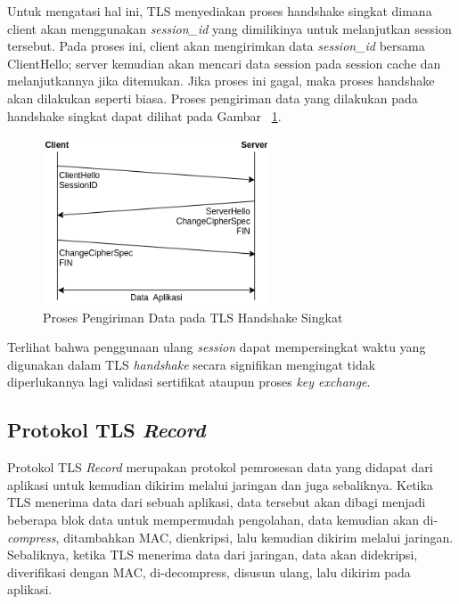     Untuk mengatasi hal ini, TLS menyediakan proses handshake singkat dimana client akan menggunakan \textit{session\_id} yang dimilikinya untuk melanjutkan session tersebut. Pada proses ini, client akan mengirimkan data \textit{session\_id} bersama ClientHello; server kemudian akan mencari data session pada session cache dan melanjutkannya jika ditemukan. Jika proses ini gagal, maka proses handshake akan dilakukan seperti biasa. Proses pengiriman data yang dilakukan pada handshake singkat dapat dilihat pada Gambar ~\ref{fig:tls-fast-handshake}.

    \begin{figure}[h]
      \centering
      \includegraphics[width=0.6\textwidth]{resources/ch-2/fast-handshake.png}
      \caption{Proses Pengiriman Data pada TLS Handshake Singkat \protect\citep{rfc5246}}
      \label{fig:tls-fast-handshake}
    \end{figure}

    Terlihat bahwa penggunaan ulang \textit{session} dapat mempersingkat waktu yang digunakan dalam TLS \textit{handshake} secara signifikan mengingat tidak diperlukannya lagi validasi sertifikat ataupun proses \textit{key exchange}.

  \subsection{Protokol TLS \textit{Record}}
    Protokol TLS \textit{Record} merupakan protokol pemrosesan data yang didapat dari aplikasi untuk kemudian dikirim melalui jaringan dan juga sebaliknya. Ketika TLS menerima data dari sebuah aplikasi, data tersebut akan dibagi menjadi beberapa blok data untuk mempermudah pengolahan, data kemudian akan di-\textit{compress}, ditambahkan MAC, dienkripsi, lalu kemudian dikirim melalui jaringan. Sebaliknya, ketika TLS menerima data dari jaringan, data akan didekripsi, diverifikasi dengan MAC, di-decompress, disusun ulang, lalu dikirim pada aplikasi.

